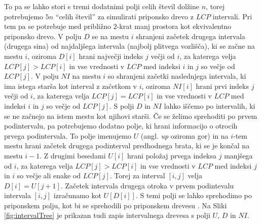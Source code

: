 To pa se lahko stori s tremi dodatnimi polji celih števil dolžine $n$, torej potrebujemo $5n$ \enquote{celih števil} za simulirati priponsko drevo z $LCP$ intervali. Pri tem pa se potrebuje med približno $2$-krat manj prostora kot ekvivalentno priponsko drevo. V polju $D$ se na mestu $i$ shranjeni začetek drugega intervala (drugega sina) od najdaljšega intervala (najbolj plitvega vozlišča), ki se začne na mestu $i$, oziroma $D[i]$ hrani največji indeks $j$ večji od $i$, za katerega velja $LCP[j]>LCP[i]$ in vse vrednosti v $LCP$ med indeksi $i$ in $j$ so večje od $LCP[j]$. V polju $NI$ na mestu $i$ so shranjeni začetki naslednjega intervala, ki ima istega starša kot interval z začetkom v $i$, oziroma $NI[i]$ hrani prvi indeks $j$ večji od $i$, za katerega velja $LCP[j]=LCP[i]$ in vse vrednosti v $LCP$ med indeksi $i$ in $j$ so večje od $LCP[j]$. S polji $D$ in $NI$ lahko iščemo po intervalih, ki se ne začnejo na istem mestu kot njihovi starši. Če se želimo sprehoditi po prvem podintervalu, pa potrebujemo dodatno polje, ki hrani informacijo o otrocih prvega podintervala. To polje imenujemo $U$ (angl. \textit{up} oziroma gor) in na $i$-tem mestu hrani začetek drugega podinterval predhodnega brata, ki se je končal na mestu $i-1$. Z drugimi besedami $U[i]$ hrani položaj prvega indeksa $j$ manjšega od $i$, za katerega velja $LCP[j]>LCP[i]$ in vse vrednosti v $LCP$ med indeksi $j$ in $i$ so večje ali enake od $LCP[j]$. Torej za interval $[i,j]$ velja $D[i]=U[j+1]$. Začetek intervala drugega otroka v prvem podintevalu intervala $[i,j]$ izračunamo kot $U[D[i]]$. S temi polji se lahko sprehodimo po priponskem polju, kot bi se sprehodili po priponskem drevesu \cite{Abouelhoda2004}. Na Sliki \ref{fig:intervalTree} je prikazan tudi zapis intervalnega drevesa s polji $U$, $D$ in $NI$. 

